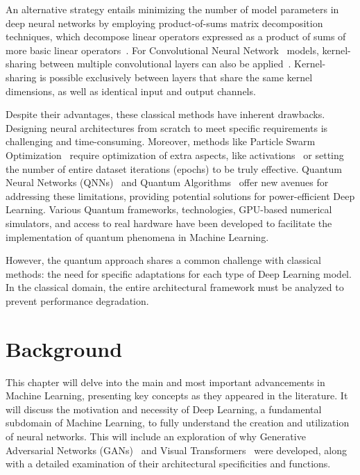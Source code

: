 \documentclass[12pt,a4paper]{report}
\begin{document}
An alternative strategy entails minimizing the number of model parameters in deep neural networks by employing product-of-sums matrix decomposition techniques, which decompose linear operators expressed as a product of sums of more basic linear operators~\cite{wu2018prodsumnet}. For Convolutional Neural Network~\cite{wen2021convolutional} models, kernel-sharing between multiple convolutional layers can also be applied~\cite{azadbakht2022drastically}. Kernel-sharing is possible exclusively between layers that share the same kernel dimensions, as well as identical input and output channels.

Despite their advantages, these classical methods have inherent drawbacks. Designing neural architectures from scratch to meet specific requirements is challenging and time-consuming. Moreover, methods like Particle Swarm Optimization~\cite{7986470} require optimization of extra aspects, like activations~\cite{han1995influence, NIPS2017_a96b65a7, xu2020reluplex} or setting the number of entire dataset iterations (epochs) to be truly effective. Quantum Neural Networks (QNNs)~\cite{abbas2021power} and Quantum Algorithms~\cite{cerezo2021variational} offer new avenues for addressing these limitations, providing potential solutions for power-efficient Deep Learning. Various Quantum frameworks, technologies, GPU-based numerical simulators, and access to real hardware have been developed to facilitate the implementation of quantum phenomena in Machine Learning.

However, the quantum approach shares a common challenge with classical methods: the need for specific adaptations for each type of Deep Learning model.
In the classical domain, the entire architectural framework must be analyzed to prevent performance degradation.
\chapter{Background}\vspace{-12pt}
This chapter will delve into the main and most important advancements in Machine Learning, presenting key concepts as they appeared in the literature. It will discuss the motivation and necessity of Deep Learning, a fundamental subdomain of Machine Learning, to fully understand the creation and utilization of neural networks. This will include an exploration of why Generative Adversarial Networks (GANs)~\cite{goodfellow2014generative} and Visual Transformers~\cite{vaswani2017attention, dosovitskiy2020} were developed, along with a detailed examination of their architectural specificities and functions.
\end{document}
